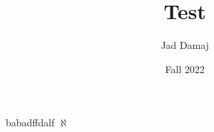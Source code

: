 \documentclass{article}
\title{Test}
\author{Jad Damaj}
\date{Fall 2022}
\begin{document}
    \maketitle

    babadffdalf
    $ \aleph $
\end{document}
